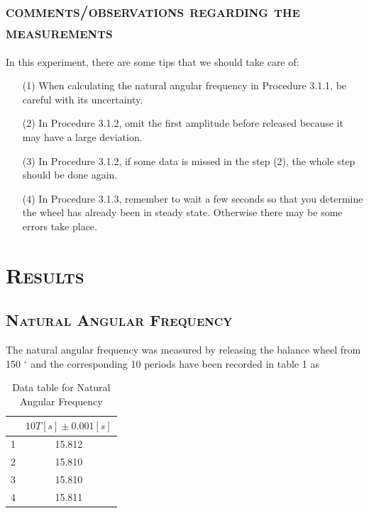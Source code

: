 \documentclass[a4paper,12pt]{article}
\begin{document}
\subsection{\textsc{comments/observations regarding the measurements}}
In this experiment, there are some tips that we should take care of:
\begin{itemize}
\item[(1)] When calculating the natural angular frequency in Procedure 3.1.1, be careful with its uncertainty.
\item[(2)] In Procedure 3.1.2, omit the first amplitude before released because it may have a large deviation.
\item[(3)] In Procedure 3.1.2, if some data is missed in the step (2), the whole step should be done again.
\item[(4)] In Procedure 3.1.3, remember to wait a few seconds so that you determine the wheel has already been in steady state. Otherwise there may be some errors take place.
\end{itemize}
\newpage 
\section{\textsc{Results}}
\subsection{\textsc{Natural Angular Frequency}}
The natural angular frequency was measured by releasing the balance wheel from 150 $^{\circ}$ and the corresponding 10 periods have been recorded in table 1 as
\begin{table}[h]
\begin{center}
\begin{tabular}{|c|c|}
\hline
   & $10T [s] \pm 0.001 [s]$ \\
\hline
1 & 15.812 \\
2 & 15.810 \\
3 & 15.810 \\
4 & 15.811 \\
\hline
\end{tabular}
\caption{Data table for Natural Angular Frequency}
\end{center}
\end{table}
\end{document}
